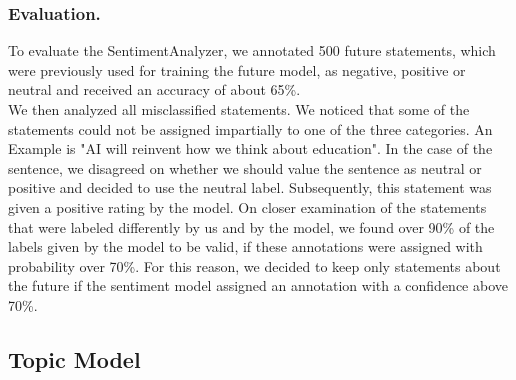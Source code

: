 \subsubsection{Evaluation.}
To evaluate the SentimentAnalyzer, we annotated 500 future statements, which were previously used for training the future model, as negative, positive or neutral and received an accuracy of about 65\%.
\\
We then analyzed all misclassified statements.
We noticed that some of the statements could not be assigned impartially to one of the three categories.
An Example is "AI will reinvent how we think about education".
In the case of the sentence, we disagreed on whether we should value the sentence as neutral or positive and decided to use the neutral label.
Subsequently, this statement was given a positive rating by the model.
On closer examination of the statements that were labeled differently by us and by the model, we found over 90\% of the labels given by the model to be valid, if these annotations were assigned with probability over 70\%.
For this reason, we decided to keep only statements about the future if the sentiment model assigned an annotation with a confidence above 70\%.

\subsection{Topic Model}
\label{topic-model}
